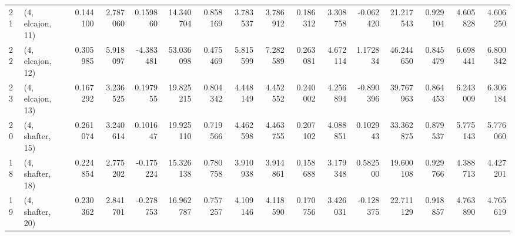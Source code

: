 \begin{tabular}{llrrrrrrrrrrrrrr}
21 &  (4, elcajon, 11) &   0.144100 &  2.787060 &  0.159860 &  14.340704 &  0.858169 &   3.783537 &  3.786912 &  0.186312 &  3.308758 & -0.062420 &   21.217543 &  0.929104 &   4.605828 &   4.606250 \\
22 &  (4, elcajon, 12) &   0.305985 &  5.918097 & -4.383481 &  53.036098 &  0.475469 &   5.815599 &  7.282589 &  0.263081 &  4.672114 &  1.172834 &   46.244650 &  0.845479 &   6.698441 &   6.800342 \\
23 &  (4, elcajon, 13) &   0.167292 &  3.236525 &  0.197955 &  19.825215 &  0.804342 &   4.448149 &  4.452552 &  0.240002 &  4.256894 & -0.890396 &   39.767963 &  0.864453 &   6.243009 &   6.306184 \\
20 &  (4, shafter, 15) &   0.261074 &  3.240614 &  0.101647 &  19.925110 &  0.719566 &   4.462598 &  4.463755 &  0.207102 &  4.088851 &  0.102943 &   33.362875 &  0.879537 &   5.775143 &   5.776060 \\
18 &  (4, shafter, 18) &   0.224854 &  2.775202 & -0.175224 &  15.326138 &  0.780758 &   3.910938 &  3.914861 &  0.158688 &  3.179348 &  0.582500 &   19.600108 &  0.929766 &   4.388713 &   4.427201 \\
19 &  (4, shafter, 20) &   0.230362 &  2.841701 & -0.278753 &  16.962787 &  0.757257 &   4.109146 &  4.118590 &  0.170756 &  3.426031 & -0.128375 &   22.711129 &  0.918857 &   4.763890 &   4.765619 \\
\bottomrule
\end{tabular}
